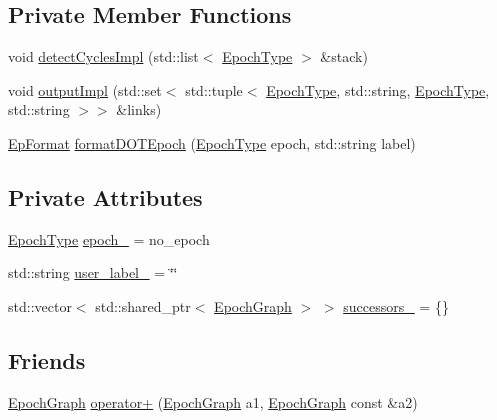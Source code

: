 \subsection*{Private Member Functions}
\begin{DoxyCompactItemize}
\item 
void \hyperlink{structvt_1_1termination_1_1graph_1_1_epoch_graph_aa0627e3c3ec01fca794fca2d2c9fec11}{detect\+Cycles\+Impl} (std\+::list$<$ \hyperlink{namespacevt_a81d11b28122d43bf9834577e4a06440f}{Epoch\+Type} $>$ \&stack)
\item 
void \hyperlink{structvt_1_1termination_1_1graph_1_1_epoch_graph_ab789ab171cd6a89f687642263e2ef7b3}{output\+Impl} (std\+::set$<$ std\+::tuple$<$ \hyperlink{namespacevt_a81d11b28122d43bf9834577e4a06440f}{Epoch\+Type}, std\+::string, \hyperlink{namespacevt_a81d11b28122d43bf9834577e4a06440f}{Epoch\+Type}, std\+::string $>$$>$ \&links)
\item 
\hyperlink{structvt_1_1termination_1_1graph_1_1_epoch_graph_a127b9f54d98b9645451c2d9a2821d10e}{Ep\+Format} \hyperlink{structvt_1_1termination_1_1graph_1_1_epoch_graph_abbdca7798e48c2d4718cfc2bd55e921d}{format\+D\+O\+T\+Epoch} (\hyperlink{namespacevt_a81d11b28122d43bf9834577e4a06440f}{Epoch\+Type} epoch, std\+::string label)
\end{DoxyCompactItemize}
\subsection*{Private Attributes}
\begin{DoxyCompactItemize}
\item 
\hyperlink{namespacevt_a81d11b28122d43bf9834577e4a06440f}{Epoch\+Type} \hyperlink{structvt_1_1termination_1_1graph_1_1_epoch_graph_a833365232980fd3e2ab084550c6efa20}{epoch\+\_\+} = no\+\_\+epoch
\item 
std\+::string \hyperlink{structvt_1_1termination_1_1graph_1_1_epoch_graph_ab999242f776318d97475ccbe6a362c71}{user\+\_\+label\+\_\+} = \char`\"{}\char`\"{}
\item 
std\+::vector$<$ std\+::shared\+\_\+ptr$<$ \hyperlink{structvt_1_1termination_1_1graph_1_1_epoch_graph}{Epoch\+Graph} $>$ $>$ \hyperlink{structvt_1_1termination_1_1graph_1_1_epoch_graph_ac30660eb1ec7ffc171da6d99b34513ee}{successors\+\_\+} = \{\}
\end{DoxyCompactItemize}
\subsection*{Friends}
\begin{DoxyCompactItemize}
\item 
\hyperlink{structvt_1_1termination_1_1graph_1_1_epoch_graph}{Epoch\+Graph} \hyperlink{structvt_1_1termination_1_1graph_1_1_epoch_graph_a434b99e8fb7dc5980beb1389cb8b5e6e}{operator+} (\hyperlink{structvt_1_1termination_1_1graph_1_1_epoch_graph}{Epoch\+Graph} a1, \hyperlink{structvt_1_1termination_1_1graph_1_1_epoch_graph}{Epoch\+Graph} const \&a2)
\end{DoxyCompactItemize}



